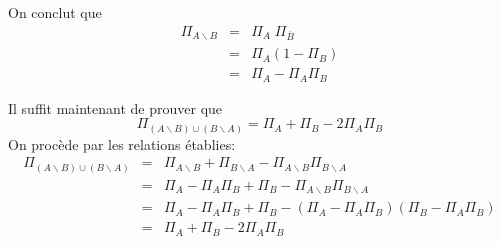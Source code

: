 \documentclass{report}
\begin{document}
\begin{myproof}
On conclut que 
\begin{eqnarray*}
  \varPi_{A\backslash B}& =&  \varPi_A \; \varPi_{\overline{B}}\\
                        &=& \varPi_A \left( 1 - \varPi_B\right)\\
                        &=& \varPi_A - \varPi_A\varPi_B
\end{eqnarray*}

 Il suffit maintenant de prouver que 
 $$
 \varPi_{(A\backslash B) \cup (B\backslash A)} = \varPi_A + \varPi_B -
2\varPi_A\varPi_B
 $$
On procède par les relations établies:
\begin{eqnarray*}
  \varPi_{ (A\backslash B) \cup (B\backslash A)}  &=& \varPi_{A\backslash B} +
  \varPi_{B\backslash A}  - \varPi_{A\backslash B}\varPi_{B\backslash A}\\
                                                  &=&
                                                  \varPi_A -\varPi_A\varPi_B +
                                                  \varPi_B - \varPi_{A\backslash
                                                  B}\varPi_{B\backslash A}\\
                                                  &=&
                                                  \varPi_A -\varPi_A\varPi_B +
                                                  \varPi_B - \left(\varPi_A -
                                                  \varPi_{A}\varPi_B\right)\left(\varPi_B
                                                - \varPi_A\varPi_B\right)\\
                                                  &=& \varPi_A + \varPi_B -
                                                  2\varPi_A\varPi_B 
\end{eqnarray*}

\end{myproof}

\end{document}
